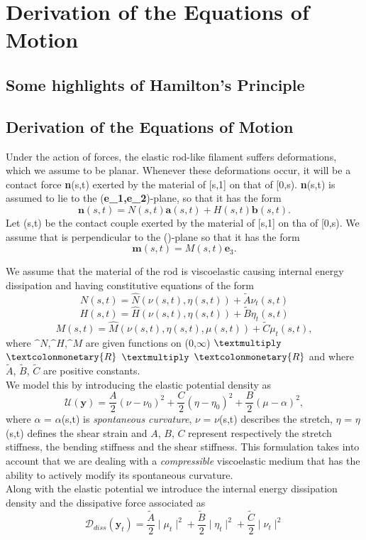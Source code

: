 \documentclass[12pt]{article}
\newcommand{\cB}{B}
\newcommand{\cA}{A}
\newcommand{\cC}{C}
\begin{document}
\section{Derivation of the Equations of Motion
}\label{Derivation of the Equations of Motion
}
\subsection{Some highlights of Hamilton's Principle}
\subsection{Derivation of the Equations of Motion}
Under the action of forces, the elastic rod-like filament suffers deformations, which we assume to be planar. Whenever these deformations occur, it will be a contact force \textbf{n}(s,t) exerted by the material of [s,1] on that of [0,s). \textbf{n}(s,t) is assumed to lie to the (\textbf{e_1,e_2})-plane, so that it has the form
\[  \mathbf{n}(s,t)= N(s,t) \mathbf{a}(s,t) + H(s,t)\mathbf{b} (s,t).
\]
Let (s,t) be the contact couple exerted by the material of [s,1] on tha of [0,s). We assume that  is perpendicular to the ()-plane so that it has the form
\[ 
\mathbf{m}(s,t) = M(s,t)\mathbf{e}_3.
\]

We assume that the material of the rod is viscoelastic causing internal energy dissipation and having constitutive equations of the form
\[  N (s,t)=  \hat{N}(\nu (s,t),\eta (s,t)) + \tilde{A} \nu_t (s,t)
\]
\[  H (s,t)=  \hat{H}(\nu (s,t),\eta (s,t)) + \tilde{B} \eta_t (s,t)
\]
\[  M (s,t)=  \hat{M}(\nu (s,t),\eta (s,t), \mu(s,t)) + \tilde{C} \mu_t (s,t),
\]
where $\^{N}$,$\^{H}$,$\^{M}$ are given functions on (0,$\infty$) $\textmultiply$ $\textcolonmonetary{R}$ $\textmultiply$ $\textcolonmonetary{R}$ and where $\tilde{A}$, $\tilde{B}$, $\tilde{C}$ are positive constants.
\\
We model this by introducing the elastic potential density  as
\[ \mathcal{U}(\mathbf{y}) = \frac{\cA}{2} (\nu - \nu_0)^2
+ \frac{\cC}{2} (\eta - \eta_0 )^2
+ \frac{\cB}{2} (\mu -\alpha)^2,
\]
where $\alpha$ = $\alpha$(s,t) is \emph{spontaneous curvature}, $\nu$ = $\nu$(s,t) describes the stretch, $\eta$ = $\eta$(s,t) defines the shear strain and $\cA$, $\cB$, $\cC$ represent respectively the stretch stiffness, the bending stiffness and the shear stiffness. 
This formulation takes into account that we are dealing with a \emph{compressible} viscoelastic medium that has the ability to actively modify its spontaneous curvature.
\\
Along with the elastic potential we introduce the internal energy dissipation density  and the dissipative force associated as 
\[ \mathcal{D}_{diss}(\mathbf{y}_t) = \frac{\tilde{A}}{2}\mid\mu_t\mid^2 + \frac{\tilde{B}}{2}\mid\eta_t\mid^2
+ \frac{\tilde{C}}{2}\mid\nu_t\mid^2
\]
\end{document}

